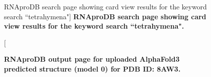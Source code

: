 \begin{center}
    \begin{figure}[H]
        \caption[RNAproDB search page showing card view results for the keyword search ``tetrahymena"]{\textbf{ RNAproDB search page showing card view results for the keyword search ``tetrahymena".}}
  \label{fig:rnaprodbS1}
\end{figure}
\end{center}

\begin{center}
    \begin{figure}[H]
        \caption[RNAproDB output page for uploaded AlphaFold3 predicted structure (model 0) for PDB ID: 8AW3]{\textbf{ RNAproDB output page for uploaded AlphaFold3 predicted structure (model 0) for PDB ID: 8AW3.}}
  \label{fig:rnaprodbS2}
\end{figure}
\end{center}

